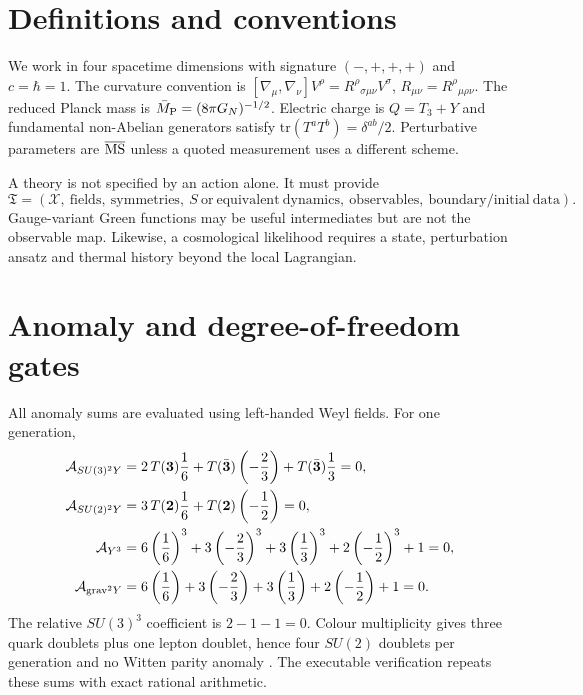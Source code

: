 \documentclass[11pt,a4paper]{article}
\newcommand{\Mpl}{\bar M_{\rm P}}
\begin{document}
\section{Definitions and conventions}
We work in four spacetime dimensions with signature $(-,+,+,+)$ and $c=\hbar=1$.  The curvature convention is $[\nabla_\mu,\nabla_\nu]V^\rho=R^\rho{}_{\sigma\mu\nu}V^\sigma$, $R_{\mu\nu}=R^\rho{}_{\mu\rho\nu}$.  The reduced Planck mass is $\Mpl=(8\pi G_N)^{-1/2}$.  Electric charge is $Q=T_3+Y$ and fundamental non-Abelian generators satisfy $\mathrm{tr}(T^aT^b)=\delta^{ab}/2$.  Perturbative parameters are $\overline{\rm MS}$ unless a quoted measurement uses a different scheme.

A theory is not specified by an action alone.  It must provide
\begin{equation}
\mathfrak T=(\mathcal X,\ \mathrm{fields},\ \mathrm{symmetries},\ S\ \mathrm{or\ equivalent\ dynamics},\ \mathrm{observables},\ \mathrm{boundary/initial\ data}).
\end{equation}
Gauge-variant Green functions may be useful intermediates but are not the observable map.  Likewise, a cosmological likelihood requires a state, perturbation ansatz and thermal history beyond the local Lagrangian.



\section{Anomaly and degree-of-freedom gates}
All anomaly sums are evaluated using left-handed Weyl fields.  For one generation,
\begin{align}
\mathcal A_{SU(3)^2Y}&=2\,T(\mathbf3)\frac16+T(\bar{\mathbf3})\left(-\frac23\right)+T(\bar{\mathbf3})\frac13=0,\\
\mathcal A_{SU(2)^2Y}&=3\,T(\mathbf2)\frac16+T(\mathbf2)\left(-\frac12\right)=0,\\
\mathcal A_{Y^3}&=6\left(\frac16\right)^3+3\left(-\frac23\right)^3+3\left(\frac13\right)^3+2\left(-\frac12\right)^3+1=0,\\
\mathcal A_{{\rm grav}^2Y}&=6\left(\frac16\right)+3\left(-\frac23\right)+3\left(\frac13\right)+2\left(-\frac12\right)+1=0.
\end{align}
The relative $SU(3)^3$ coefficient is $2-1-1=0$.  Colour multiplicity gives three quark doublets plus one lepton doublet, hence four $SU(2)$ doublets per generation and no Witten parity anomaly \cite{Witten1982}.  The executable verification repeats these sums with exact rational arithmetic.
\end{document}
